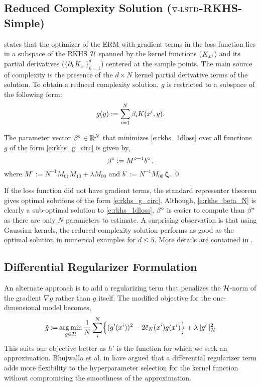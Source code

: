 \subsection{Reduced Complexity Solution ($\nabla\text{-LSTD}$-RKHS-Simple)}
\label{s:simple_rkhs}
 states that the optimizer of the ERM with gradient terms in the loss function lies in a subspace of the RKHS ${\cal H}$ spanned by the kernel functions ($K_{x^i}$) and its partial derivatives ($\{\partial_k K_{x^i}\}_{k=1}^d$) centered at the sample points. The main source of complexity is the presence of the $d \times N$ kernel partial derivative terms of the solution. To obtain a reduced complexity solution, $g$ is restricted to a subspace of the following form:
\begin{equation}
g(y)  := \sum_{i=1}^N \rkhsparam_i K(x^i,y).
\label{e:rkhs_g_circ}
\end{equation}
\begin{proposition}
	\label{t:bcirc}
	The parameter vector $\beta^\circ \in \mathbb{R}^N$ that minimizes \eqref{e:rkhs_1dloss}  over all functions $g$ of the form \eqref{e:rkhs_g_circ} is given by,
	\begin{equation}
	\rkhsparam^\circ  := M^{\circ -1} b^\circ   \,,
	\label{e:rkhs_beta_N}
	\end{equation}
	where $ M^\circ := N^{-1} M_{01} M_{10} + \lambda M_{00}$ and $ b^\circ := N^{-1} M_{00} \, \boldsymbol{\zeta} $.
	\qed
\end{proposition}
If the loss function did not have gradient terms, the standard representer theorem gives optimal solutions of the form \eqref{e:rkhs_g_circ}. Although, \eqref{e:rkhs_beta_N} is clearly a sub-optimal solution to \eqref{e:rkhs_1dloss}, $\beta^\circ$  is easier to compute than $\beta^*$ as there are only $N$ parameters to estimate. A surprising observation is that using Gaussian kernels, the reduced complexity solution performs as good as the optimal solution in numerical examples for $d \leq 5$. More details are contained in .

\subsection{Differential Regularizer Formulation}
\label{s:diffReg} 

An alternate approach is to add a regularizing term that penalizes the ${\cal H}$-norm of the gradient $\nabla g$ rather than $g$ itself. The modified objective for the one-dimensional model becomes,
\begin{equation}
\tilg \eqdef \argmin_{g\in\clH} \frac{1}{N} \sum_{i}^N \Bigl\{ (g'(x^i))^2 - 2 \tilc_N(x^i) g(x^i)  \Bigr\} + \lambda \|g'\|_\clH^2
\label{e:rkhs_1dloss_diff}
\end{equation}
This suits our objective better as $h'$ is the function for which we seek an approximation. Bhujwalla et al. in \cite{bhujlaugil} have argued that a differential regularizer term adds more flexibility to the hyperparameter selection for the kernel function without compromising the smoothness of the approximation.

